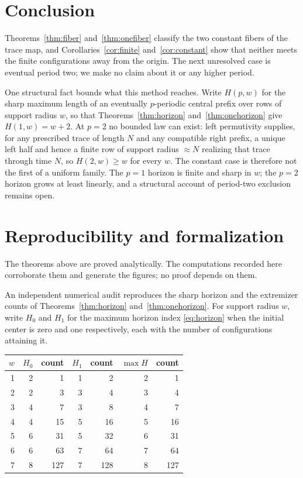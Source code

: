 \documentclass[11pt]{article}
\begin{document}
\section{Conclusion}

Theorems~\ref{thm:fiber} and~\ref{thm:onefiber} classify the two constant fibers
of the trace map, and Corollaries~\ref{cor:finite} and~\ref{cor:constant} show
that neither meets the finite configurations away from the origin.  The next
unresolved case is eventual period two; we make no claim about it or any higher
period.

One structural fact bounds what this method reaches.  Write $H(p,w)$ for the
sharp maximum length of an eventually $p$-periodic central prefix over rows of
support radius $w$, so that Theorems~\ref{thm:horizon}
and~\ref{thm:onehorizon} give $H(1,w)=w+2$.  At $p=2$ no bounded law can exist:
left permutivity supplies, for any prescribed trace of length $N$ and any
compatible right prefix, a unique left half and hence a finite row of support
radius $\approx N$ realizing that trace through time $N$, so $H(2,w)\ge w$ for
every $w$.  The constant case is therefore not the first of a uniform family.
The $p=1$ horizon is finite and sharp in $w$; the $p=2$ horizon grows at least
linearly, and a structural account of period-two exclusion remains open.

\appendix
\section{Reproducibility and formalization}\label{app:repro}

The theorems above are proved analytically.  The computations recorded here
corroborate them and generate the figures; no proof depends on them.

An independent numerical audit reproduces the sharp horizon and the extremizer
counts of Theorems~\ref{thm:horizon} and~\ref{thm:onehorizon}.  For support
radius $w$, write $H_0$ and $H_1$ for the maximum horizon index
\eqref{eq:horizon} when the initial center is zero and one respectively, each
with the number of configurations attaining it.

\begin{center}
\small
\begin{tabular}{@{}rrrrrrr@{}}
\toprule
$w$ & $H_0$ & count & $H_1$ & count & $\max H$ & count\\
\midrule
1&2&1&1&2&2&1\\
2&2&3&3&4&3&4\\
3&4&7&3&8&4&7\\
4&4&15&5&16&5&16\\
5&6&31&5&32&6&31\\
6&6&63&7&64&7&64\\
7&8&127&7&128&8&127\\
\bottomrule
\end{tabular}
\end{center}
\end{document}
